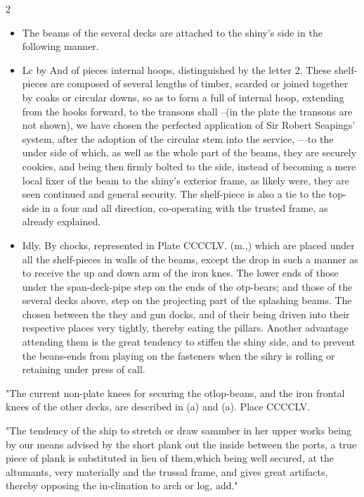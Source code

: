 \documentclass[10pt]{article}
\begin{document}
\begin{multicols}{2}
\begin{itemize}\setlength{\itemsep}{1pt}
\item The beams of the several decks are attached to the shiny’s side in the following manner.
\item Lc by And of pieces internal hoops, distinguished by the letter 2. These shelf-pieces are composed of several lengths of timber, scarded or joined together by coaks or circular downs, so as to form a full of internal hoop, extending from the hooks forward, to the transons shall --(in the plate the transons are not shown), we have chosen the perfected application of Sir Robert Seapings’ system, after the adoption of the circular stem into the service, —to the under side of which, as well as the whole part of the beams, they are securely cookies, and being then firmly bolted to the side, instead of becoming a mere local fixer of the beam to the shiny’s exterior frame, as likely were, they are seen continued and general security. The shelf-piece is also a tie to the top-side in a four and all direction, co-operating with the trusted frame, as already explained.
\item Idly. By chocks, represented in Plate CCCCLV. (m.,) which are placed under all the shelf-pieces in walls of the beams, except the drop in such a manner as to receive the up and down arm of the iron knes. The lower ends of those under the span-deck-pipe step on the ends of the otp-bears; and those of the several decks above, step on the projecting part of the splashing beams. The chosen between the they and gun docks, and of their being driven into their respective places very tightly, thereby eating the pillars. Another advantage attending them is the great tendency to stiffen the shiny side, and to prevent the beans-ends from playing on the fasteners when the sihry is rolling or retaining under press of call.
\end{itemize}
"The current non-plate knees for securing the otlop-beans, and the iron frontal knees of the other decks, are described in (a) and (a). Place CCCCLV.

"The tendency of the ship to stretch or draw sammber in her upper works being by our means advised by the short plank out the inside between the ports, a true piece of plank is substituted in lieu of them,which being well secured, at the altumants, very materially and the trussal frame, and gives great artifacts, thereby opposing the in-clination to arch or log, add."


\end{multicols}
\end{document}
